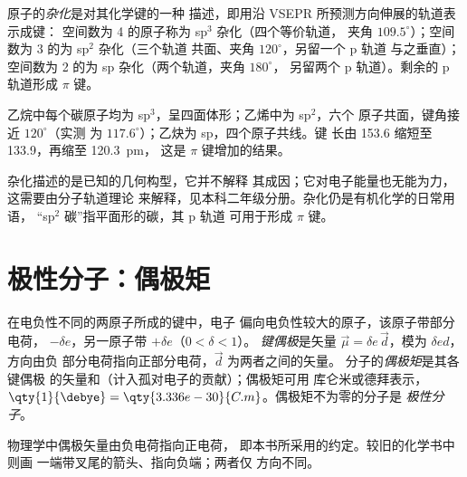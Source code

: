 \begin{definition}[杂化]\label{def:b1:lewis-resonance-vsepr:hybridisation}
原子的\emph{杂化}是对其化学键的一种
描述，即用沿 VSEPR 所预测方向伸展的轨道表示成键：
空间数为 4 的原子称为 sp$^3$ 杂化（四个等价轨道，
夹角 $109.5^\circ$）；空间数为 3 的为 sp$^2$ 杂化（三个轨道
共面、夹角 $120^\circ$，另留一个 p 轨道
与之垂直）；空间数为 2 的为 sp 杂化（两个轨道，夹角 $180^\circ$，
另留两个 p 轨道）。剩余的 p 轨道形成 $\pi$ 键。
\end{definition}

\begin{example}[有机化学中的碳原子]\label{ex:b1:lewis-resonance-vsepr:carbon}
乙烷中每个碳原子均为 sp$^3$，呈四面体形；乙烯中为 sp$^2$，六个
原子共面，键角接近 $120^\circ$（实测 
为 $117.6^\circ$）；乙炔为 sp，四个原子共线。键
长由 153.6 缩短至 133.9，再缩至 \qty{120.3}{pm}，
这是 $\pi$ 键增加的结果。
\end{example}

\begin{remark}[描述而非原因]\label{rem:b1:lewis-resonance-vsepr:hybrid-limit}
杂化描述的是已知的几何构型，它并不解释
其成因；它对电子能量也无能为力，这需要由分子轨道理论
来解释，见本科二年级分册。杂化仍是有机化学的日常用语，
“sp$^2$ 碳”指平面形的碳，其 p 轨道
可用于形成 $\pi$ 键。
\end{remark}

\section{极性分子：偶极矩}

\begin{definition}\label{def:b1:lewis-resonance-vsepr:dipole}
在电负性不同的两原子所成的键中，电子
偏向电负性较大的原子，该原子带部分电荷，
$-\delta e$，另一原子带 $+\delta e$（$0 < \delta < 1$）。
\emph{键偶极}是矢量 $\vec\mu = \delta e\,
\vec d$，模为 $\delta e d$，方向由负
部分电荷指向正部分电荷，$\vec d$ 为两者之间的矢量。
分子的\emph{偶极矩}是其各键偶极
的矢量和（计入孤对电子的贡献）；偶极矩可用
库仑米或德拜表示，$\qty{1}{\debye} =
\qty{3.336e-30}{C.m}$。偶极矩不为零的分子是
\emph{极性分子}。
\end{definition}

\begin{remark}[方向约定]\label{rem:b1:lewis-resonance-vsepr:convention}
物理学中偶极矢量由负电荷指向正电荷，
即本书所采用的约定。较旧的化学书中则画
一端带叉尾的箭头、指向负端；两者仅
方向不同。
\end{remark}

